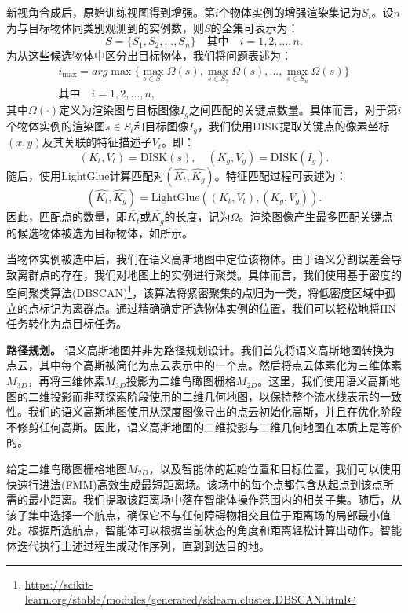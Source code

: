 新视角合成后，原始训练视图得到增强。第$i$个物体实例的增强渲染集记为$S_i$。设$n$为与目标物体同类别观测到的实例数，则$S$的全集可表示为：
\begin{equation}
    S = \{S_1, S_2, \ldots, S_n\}  \quad \text{其中} \quad i=1,2,\ldots,n.
\end{equation}
为从这些候选物体中区分出目标物体，我们将问题表述为：
\begin{equation}
\begin{split}
      i_{\text{max}} = arg\max \{ \max_{s \in S_1} \Omega (s), \max_{s \in S_2} \Omega (s), \ldots, \max_{s \in S_n} \Omega (s) \} \\
      \text{其中} \quad i=1,2,\ldots,n,
    \label{eq:match}  
\end{split}
\end{equation}
其中$\Omega (\cdot)$定义为渲染图与目标图像$I_g$之间匹配的关键点数量。具体而言，对于第$i$个物体实例的渲染图$s \in S_i$和目标图像$I_g$，我们使用DISK\cite{tyszkiewicz2020disk}提取关键点的像素坐标$(x, y)$及其关联的特征描述子$V_t$。即：
\begin{equation}
(K_t, V_t) = \text{DISK}(s), \quad (K_g, V_g) = \text{DISK}(I_g).
\label{eq:feature1}
\end{equation}
随后，使用LightGlue\cite{lindenberger2023lightglue}计算匹配对$(\hat{K_t}, \hat{K_g})$。特征匹配过程可表述为：
\begin{equation}
(\hat{K_t}, \hat{K_g}) = \text{LightGlue}((K_t, V_t), (K_g, V_g)).
\label{eq:matching}
\end{equation}
因此，匹配点的数量，即$\hat{K_t}$或$\hat{K_g}$的长度，记为$\Omega$。渲染图像产生最多匹配关键点的候选物体被选为目标物体，如所示。

当物体实例被选中后，我们在语义高斯地图中定位该物体。由于语义分割误差会导致离群点的存在，我们对地图上的实例进行聚类。具体而言，我们使用基于密度的空间聚类算法(DBSCAN)\footnote{\url{https://scikit-learn.org/stable/modules/generated/sklearn.cluster.DBSCAN.html}}，该算法将紧密聚集的点归为一类，将低密度区域中孤立的点标记为离群点。通过精确确定所选物体实例的位置，我们可以轻松地将IIN任务转化为点目标任务。

\textbf{路径规划。} 语义高斯地图并非为路径规划设计。我们首先将语义高斯地图转换为点云，其中每个高斯被简化为点云表示中的一个点。然后将点云体素化为三维体素$M_{3D}$，再将三维体素$M_{3D}$投影为二维鸟瞰图栅格$M_{2D}$。这里，我们使用语义高斯地图的二维投影而非预探索阶段使用的二维几何地图，以保持整个流水线表示的一致性。我们的语义高斯地图使用从深度图像导出的点云初始化高斯，并且在优化阶段不修剪任何高斯。因此，语义高斯地图的二维投影与二维几何地图在本质上是等价的。

给定二维鸟瞰图栅格地图$M_{2D}$，以及智能体的起始位置和目标位置，我们可以使用快速行进法(FMM)高效生成最短距离场。该场中的每个点都包含从起点到该点所需的最小距离。我们提取该距离场中落在智能体操作范围内的相关子集。随后，从该子集中选择一个航点，确保它不与任何障碍物相交且位于距离场的局部最小值处。根据所选航点，智能体可以根据当前状态的角度和距离轻松计算出动作。智能体迭代执行上述过程生成动作序列，直到到达目的地。